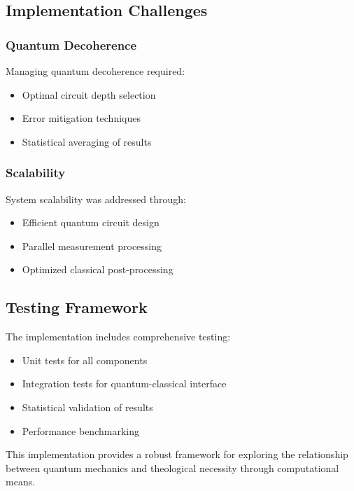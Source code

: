 \subsection{Implementation Challenges}

\subsubsection{Quantum Decoherence}
Managing quantum decoherence required:
\begin{itemize}
    \item Optimal circuit depth selection
    \item Error mitigation techniques
    \item Statistical averaging of results
\end{itemize}

\subsubsection{Scalability}
System scalability was addressed through:
\begin{itemize}
    \item Efficient quantum circuit design
    \item Parallel measurement processing
    \item Optimized classical post-processing
\end{itemize}

\subsection{Testing Framework}
The implementation includes comprehensive testing:

\begin{itemize}
    \item Unit tests for all components
    \item Integration tests for quantum-classical interface
    \item Statistical validation of results
    \item Performance benchmarking
\end{itemize}

This implementation provides a robust framework for exploring the relationship between quantum mechanics and theological necessity through computational means.